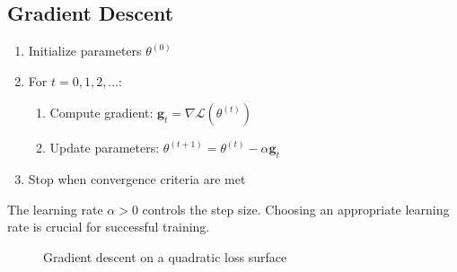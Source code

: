 \subsection{Gradient Descent}

\begin{algorithm}[H]
\caption{Batch Gradient Descent}
\begin{enumerate}
    \item Initialize parameters $\theta^{(0)}$
    \item For $t = 0, 1, 2, \ldots$:
    \begin{enumerate}
        \item Compute gradient: $\mathbf{g}_t = \nabla \mathcal{L}(\theta^{(t)})$
        \item Update parameters: $\theta^{(t+1)} = \theta^{(t)} - \alpha \mathbf{g}_t$
    \end{enumerate}
    \item Stop when convergence criteria are met
\end{enumerate}
\end{algorithm}

The learning rate $\alpha > 0$ controls the step size. Choosing an appropriate learning rate is crucial for successful training.

\begin{figure}[htbp]
    \centering
    \caption{Gradient descent on a quadratic loss surface}
    \label{fig:gd_quadratic}
\end{figure}

